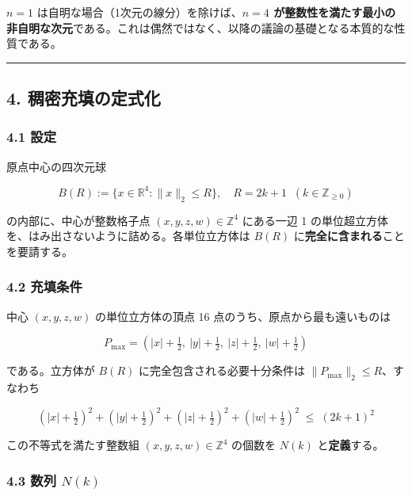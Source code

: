\documentclass[a4paper,11pt]{ltjsarticle}
\theoremstyle{definition}
\begin{document}
\(n = 1\) は自明な場合（1次元の線分）を除けば、\textbf{\(n = 4\)
が整数性を満たす最小の非自明な次元}である。これは偶然ではなく、以降の議論の基礎となる本質的な性質である。

\begin{center}\rule{0.5\linewidth}{0.5pt}\end{center}

\subsection{4.
稠密充填の定式化}\label{ux7a20ux5bc6ux5145ux586bux306eux5b9aux5f0fux5316}

\subsubsection{4.1 設定}\label{ux8a2dux5b9a}

原点中心の四次元球

\[B(R) := \{x \in \mathbb{R}^4 : \|x\|_2 \le R\}, \quad R = 2k+1 \;\; (k \in \mathbb{Z}_{\ge 0})\]

の内部に、中心が整数格子点 \((x, y, z, w) \in \mathbb{Z}^4\) にある一辺
1 の単位超立方体を、はみ出さないように詰める。各単位立方体は \(B(R)\)
に\textbf{完全に含まれる}ことを要請する。

\subsubsection{4.2 充填条件}\label{ux5145ux586bux6761ux4ef6}

中心 \((x, y, z, w)\) の単位立方体の頂点 16
点のうち、原点から最も遠いものは

\[P_{\max} = \left(|x|+\tfrac{1}{2},\ |y|+\tfrac{1}{2},\ |z|+\tfrac{1}{2},\ |w|+\tfrac{1}{2}\right)\]

である。立方体が \(B(R)\) に完全包含される必要十分条件は
\(\|P_{\max}\|_2 \le R\)、すなわち

\[\boxed{\;\left(|x|+\tfrac{1}{2}\right)^2 + \left(|y|+\tfrac{1}{2}\right)^2 + \left(|z|+\tfrac{1}{2}\right)^2 + \left(|w|+\tfrac{1}{2}\right)^2 \;\le\; (2k+1)^2\;}\]

この不等式を満たす整数組 \((x,y,z,w) \in \mathbb{Z}^4\) の個数を
\(N(k)\) と\textbf{定義}する。

\subsubsection{\texorpdfstring{4.3 数列
\(N(k)\)}{4.3 数列 N(k)}}\label{ux6570ux5217-nk}
\end{document}
